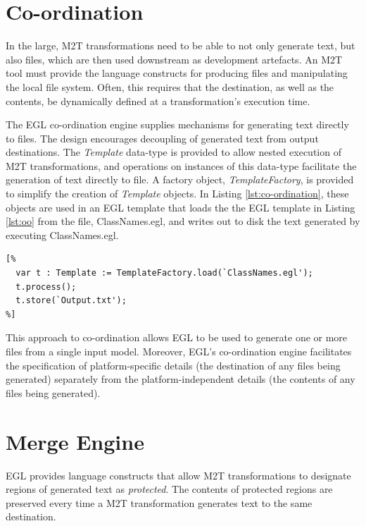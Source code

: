 \section{Co-ordination}
\label{Co-ordination}
In the large, M2T transformations need to be able to not only generate
text, but also files, which are then used downstream as development
artefacts.  An M2T tool must provide the language constructs for
producing files and manipulating the local file system.  Often, this
requires that the destination, as well as the contents, be dynamically
defined at a transformation's execution time.

The EGL co-ordination engine supplies mechanisms for generating text
directly to files.  The design encourages decoupling of generated text
from output destinations. The \emph{Template} data-type is provided to
allow nested execution of M2T transformations, and operations on
instances of this data-type facilitate the generation of text directly
to file. A factory object, \emph{TemplateFactory}, is provided to
simplify the creation of \emph{Template} objects.  In Listing
\ref{lst:co-ordination}, these objects are used in an EGL template
that loads the the EGL template in Listing \ref{lst:oo} from the file,
ClassNames.egl, and writes out to disk the text generated by executing
ClassNames.egl.

\begin{lstlisting}[basicstyle=\ttfamily\footnotesize, tabsize=2, flexiblecolumns=true, caption=Storing the name of each Class to disk., label=lst:co-ordination]
[%
  var t : Template := TemplateFactory.load(`ClassNames.egl');
  t.process();
  t.store(`Output.txt');
%]
\end{lstlisting}

This approach to co-ordination allows EGL to be used to generate one
or more files from a single input model. Moreover, EGL's co-ordination
engine facilitates the specification of platform-specific details (the
destination of any files being generated) separately from the
platform-independent details (the contents of any files being
generated).

\section{Merge Engine}
EGL provides language constructs that allow M2T transformations to
designate regions of generated text as \textit{protected}. The
contents of protected regions are preserved every time a M2T
transformation generates text to the same destination.

